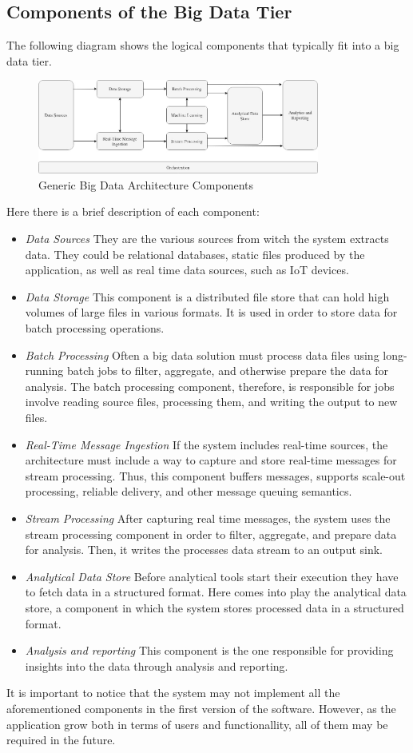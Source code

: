 \documentclass[10pt]{report}
\begin{document}
\subsection{Components of the Big Data Tier}
The following diagram shows the logical components that typically fit into a big data tier.
\begin{figure}[H]
    \centering
    \includegraphics[width=350px]{Architecture/BigDataArchitecture.jpg}
    \caption{Generic Big Data Architecture Components}
\end{figure}
Here there is a brief description of each component:
\begin{itemize}
    \item \emph{Data Sources} They are the various sources from witch the system extracts data. They could be relational databases, static files produced by the application, as well as real time data sources, such as IoT devices.
    \item \emph{Data Storage} This component is a distributed file store that can hold high volumes of large files in various formats. It is used in order to store data for batch processing operations.
    \item \emph{Batch Processing} Often a big data solution must process data files using long-running batch jobs to filter, aggregate, and otherwise prepare the data for analysis. The batch processing component, therefore, is responsible for jobs involve reading source files, processing them, and writing the output to new files.
    \item \emph{Real-Time Message Ingestion} If the system includes real-time sources, the architecture must include a way to capture and store real-time messages for stream processing. Thus, this component buffers messages, supports scale-out processing, reliable delivery, and other message queuing semantics.
    \item \emph{Stream Processing} After capturing real time messages, the system uses the stream processing component in order to filter, aggregate, and prepare data for analysis. Then, it writes the processes data stream to an output sink.
    \item \emph{Analytical Data Store} Before analytical tools start their execution they have to fetch data in a structured format. Here comes into play the analytical data store, a component in which the system stores processed data in a structured format.
    \item \emph{Analysis and reporting} This component is the one responsible for providing insights into the data through analysis and reporting.
\end{itemize}
It is important to notice that the system may not implement all the aforementioned components in the first version of the software. However, as the application grow both in terms of users and functionallity, all of them may be required in the future.
\end{document}
